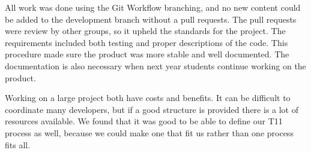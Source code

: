 All work was done using the Git Workflow branching, and no new content could be added to the development branch without a pull requests. The pull requests were review by other groups, so it upheld the standards for the project. The requirements included both testing and proper descriptions of the code. This procedure made sure the product was more stable and well documented. The documentation is also necessary when next year students continue working on the product. 

Working on a large project both have costs and benefits. It can be difficult to coordinate many developers, but if a good structure is provided there is a lot of resources available. We found that it was good to be able to define our \gls{T11} process as well, because we could make one that fit us rather than one process fits all. 
